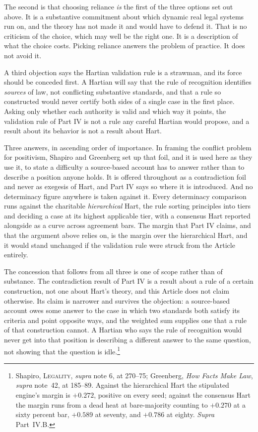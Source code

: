 The second is that choosing reliance \textit{is} the first of the three options set out above. It is a substantive commitment about which dynamic real legal systems run
on, and the theory has not made it and would have to defend it. That is no criticism of the choice, which may
well be the right one. It is a description of what the choice costs.
Picking reliance answers the problem of practice. It does not avoid it.

A third objection says the Hartian validation rule is a strawman, and its
force should be conceded first. A Hartian will say that the rule of
recognition identifies \textit{sources} of law, not conflicting substantive
standards, and that a rule so constructed would never certify both sides of
a single case in the first place. Asking only whether each authority is
valid and which way it points, the validation rule of Part IV is not a rule
any careful Hartian would propose, and a result about its behavior is not a
result about Hart.

Three answers, in ascending order of importance. In framing the conflict problem for positivism, Shapiro and Greenberg set
up that foil, and it is used here as they use it, to state a difficulty a
source-based account has to answer rather than to describe a position
anyone holds. It is offered throughout as a contradiction foil and never
as exegesis of Hart, and Part IV says so where it is introduced. And no determinacy figure anywhere is taken against it. Every determinacy comparison runs against the charitable
\textit{hierarchical} Hart, the rule sorting principles into tiers and
deciding a case at its highest applicable tier, with a consensus Hart reported alongside as a
curve across agreement bars. The margin that Part IV claims, and that the argument
above relies on, is the margin over the hierarchical Hart, and it would
stand unchanged if the validation rule were struck from the Article
entirely.

The concession that follows from all three is one of scope rather than of
substance. The contradiction result of Part IV is a result about a rule of a certain
construction, not one about Hart's theory, and this Article does not claim
otherwise. Its claim is narrower and survives the
objection: a source-based account owes some answer to the case in which
two standards both satisfy its criteria and point opposite ways, and the
weighted sum supplies one that a rule of that construction cannot. A
Hartian who says the rule of recognition would never get into that
position is describing a different answer to the same question, not
showing that the question is idle.\footnote{Shapiro, \textsc{Legality}, \textit{supra} note 6, at
270--75; Greenberg, \textit{How Facts Make Law}, \textit{supra} note~42, at
185--89.
Against the hierarchical Hart the stipulated engine's margin is $+0.272$,
positive on every seed; against the consensus Hart the margin runs from a
dead heat at bare-majority counting to $+0.270$ at a sixty percent bar,
$+0.589$ at seventy, and $+0.786$ at eighty. \textit{Supra} Part~IV.B.}

